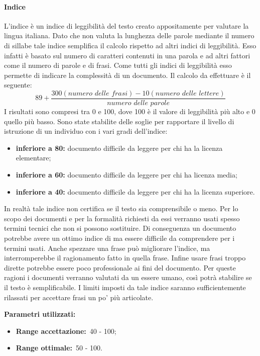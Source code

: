 			\paragraph{Indice }
				\label{sec:3.7.2.1}
				L'indice  è un indice di leggibilità del testo creato appositamente per valutare la lingua italiana. Dato che non valuta la lunghezza delle parole mediante il numero di sillabe tale indice semplifica il calcolo rispetto ad altri indici di leggibilità. Esso infatti è basato sul numero di caratteri contenuti in una parola e ad altri fattori come il numero di parole e di frasi. Come tutti gli indici di leggibilità esso permette di indicare la complessità di un documento. Il calcolo da effettuare è il seguente:
				\[89+\frac{300(numero\,\, delle\,\, frasi) - 10(numero\,\, delle\,\, lettere)}{numero\,\, delle\,\, parole}\]
				I risultati sono compresi tra 0 e 100, dove 100 è il valore di leggibilità più alto e 0 quello più basso. Sono state stabilite delle soglie per rapportare il livello di istruzione di un individuo con i vari gradi dell'indice:
				\begin{itemize}
					\item \textbf{inferiore a 80:} documento difficile da leggere per chi ha la licenza elementare;
					\item \textbf{inferiore a 60:} documento difficile da leggere per chi ha licenza media;
					\item \textbf{inferiore a 40:} documento difficile da leggere per chi ha la licenza superiore.
				\end{itemize}
				In realtà tale indice non certifica se il testo sia comprensibile o meno. Per lo scopo dei documenti e per la formalità richiesti da essi verranno usati spesso termini tecnici che non si possono sostituire. Di conseguenza un documento potrebbe avere un ottimo indice di  ma essere difficile da comprendere per i termini usati. Anche spezzare una frase può migliorare l'indice, ma interromperebbe il ragionamento fatto in quella frase. Infine usare frasi troppo dirette potrebbe essere poco professionale ai fini del documento. Per queste ragioni i documenti verranno valutati da un essere umano, così potrà stabilire se il testo è semplificabile. I limiti imposti da tale indice saranno sufficientemente rilassati per accettare frasi un po' più articolate.
				
				\textbf{Parametri utilizzati:}
				\begin{itemize}
					\item \textbf{Range accettazione:}\ 40 - 100;
					\item \textbf{Range ottimale:}\ 50 - 100.
				\end{itemize}

